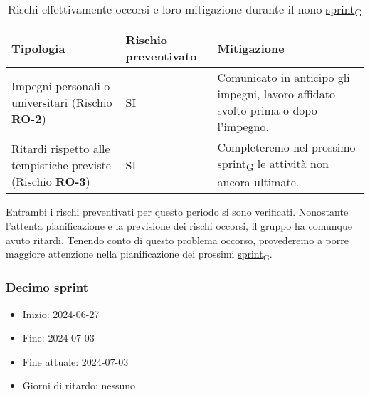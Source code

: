 \begin{table}[!h]
    \centering
    \begin{tabular}{ | p{6cm} | p{2.5cm} | p{7.5cm} | }
        \hline
        \textbf{Tipologia} & \textbf{Rischio preventivato} & \textbf{Mitigazione}  \\
        \hline
        Impegni personali o universitari (Rischio \textbf{RO-2})& SI & Comunicato in anticipo gli impegni, lavoro affidato svolto prima o dopo l’impegno. \\
        \hline
		Ritardi rispetto alle tempistiche previste (Rischio \textbf{RO-3}) & SI & Completeremo nel prossimo \href{https://7last.github.io/docs/pb/documentazione-interna/glossario\#sprint}{sprint\textsubscript{G}} le attività non ancora ultimate. \\
        \hline
    \end{tabular}
    \caption{Rischi effettivamente occorsi e loro mitigazione durante il nono \href{https://7last.github.io/docs/pb/documentazione-interna/glossario\#sprint}{sprint\textsubscript{G}}}
\end{table}

Entrambi i rischi preventivati per questo periodo si sono verificati. Nonostante l'attenta pianificazione e la previsione dei rischi occorsi, il gruppo ha comunque avuto ritardi. Tenendo conto di questo problema occorso, provederemo a porre maggiore attenzione nella pianificazione dei prossimi \href{https://7last.github.io/docs/pb/documentazione-interna/glossario\#sprint}{sprint\textsubscript{G}}.

\newpage
\subsubsection{Decimo sprint}
\begin{itemize}
    \item Inizio: 2024-06-27
    \item Fine: 2024-07-03
    \item Fine attuale: 2024-07-03
    \item Giorni di ritardo: nessuno
\end{itemize}

